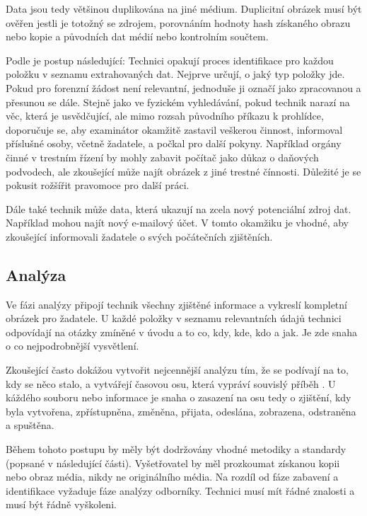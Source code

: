 \documentclass[thesis=B,czech]{FITthesis}[2012/06/26]
\begin{document}
Data jsou tedy většinou duplikována na jiné médium. Duplicitní obrázek musí být ověřen jestli je totožný se zdrojem, porovnáním hodnoty hash získaného obrazu nebo kopie a původních dat médií nebo kontrolním součtem.


Podle \cite{carroll2008computer} je postup následující: Technici opakují proces identifikace pro každou položku v seznamu extrahovaných dat. Nejprve určují, o jaký typ položky jde. Pokud pro forenzní žádost není relevantní, jednoduše ji označí jako zpracovanou a přesunou se dále. Stejně jako ve fyzickém vyhledávání, pokud technik narazí na věc, která je usvědčující, ale mimo rozsah původního příkazu k prohlídce, doporučuje se, aby examinátor okamžitě zastavil veškerou činnost, informoval příslušné osoby, včetně žadatele, a počkal pro další pokyny. Například orgány činné v trestním řízení by mohly zabavit počítač jako důkaz o daňových podvodech, ale zkoušející může najít obrázek z jiné trestné čínnosti. Důležité je se pokusit rožšířit pravomoce pro další práci.

Dále také technik může data, která ukazují na zcela nový potenciální zdroj dat. Například mohou najít nový e-mailový účet. V tomto okamžiku je vhodné, aby zkoušející informovali žadatele o svých počátečních zjištěních.

\subsection{Analýza}
Ve fázi analýzy připojí technik všechny zjištěné informace a vykreslí kompletní obrázek pro žadatele\cite{carroll2008computer}. U každé položky v seznamu relevantních údajů technici odpovídají na otázky zmíněné v úvodu a to co, kdy, kde, kdo a jak. Je zde snaha o co nejpodrobnější vysvětlení.

Zkoušející často dokážou vytvořit nejcennější analýzu tím, že se podívají na to, kdy se něco stalo, a vytvářejí časovou osu, která vypráví souvislý příběh \cite{carroll2008computer}. U káždého souboru nebo informace je snaha o zasazení na osu tedy o zjištění, kdy byla vytvořena, zpřístupněna, změněna, přijata, odeslána, zobrazena, odstraněna a spuštěna. 

Během tohoto postupu by měly být dodržovány vhodné metodiky a standardy (popsané v následující části)\cite{for_sez}. Vyšetřovatel by měl prozkoumat získanou kopii nebo obraz média, nikdy ne originálního média. Na rozdíl od fáze zabavení a identifikace vyžaduje fáze analýzy odborníky. Technici musí mít řádné znalosti a musí být řádně vyškoleni. 
\end{document}
